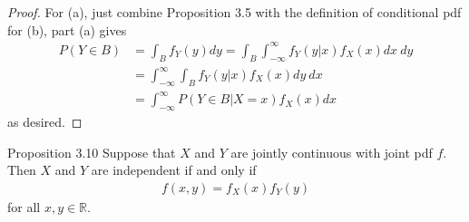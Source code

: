 \begin{proof}
For (a), just combine Proposition 3.5 with the definition of conditional pdf for (b), part (a) gives
\begin{align*}
    P(Y \in B) &= \int_B f_Y(y)dy = \int_B \int_{-\infty}^\infty f_Y(y|x)f_X(x)dx \ dy \\
    &= \int_{-\infty}^\infty \int_B f_Y(y|x)f_X(x)dy \ dx \\
    &= \int_{-\infty}^\infty P(Y \in B|X = x) f_X(x)dx
\end{align*}
as desired.
\end{proof}

\begin{boks}{Proposition 3.10}
Suppose that $X$ and $Y$ are jointly continuous with joint pdf $f$. Then $X$ and $Y$ are independent if and only if
\begin{align*}
    f(x, y) = f_X(x)f_Y(y)
\end{align*}
for all $x,y \in \mathbb{R}$.
\end{boks}

%
